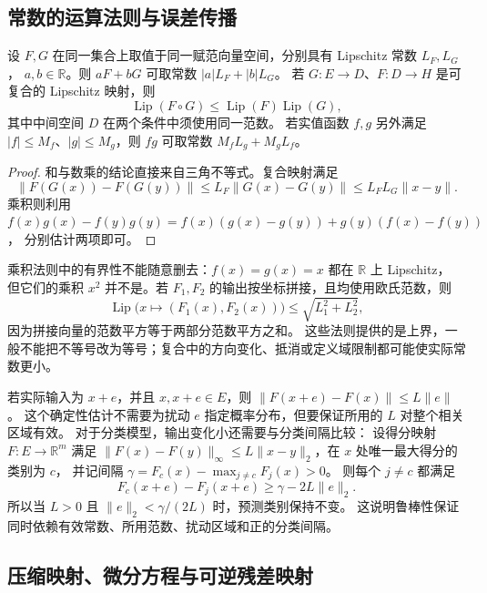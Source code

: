 \documentclass[UTF8,12pt,a4paper,fontset=fandol]{ctexart}
\begin{document}
\subsection{常数的运算法则与误差传播}
\label{subsec:lip-calculus}

\begin{proposition}\label{prop:lip-calculus}
设 $F,G$ 在同一集合上取值于同一赋范向量空间，分别具有 Lipschitz 常数 $L_F,L_G$，
$a,b\in\mathbb R$。则 $aF+bG$ 可取常数 $|a|L_F+|b|L_G$。
若 $G:E\to D$、$F:D\to H$ 是可复合的 Lipschitz 映射，则
\begin{equation}\label{eq:lip-composition}
  \operatorname{Lip}(F\circ G)\le\operatorname{Lip}(F)\operatorname{Lip}(G),
\end{equation}
其中中间空间 $D$ 在两个条件中须使用同一范数。
若实值函数 $f,g$ 另外满足 $|f|\le M_f$、$|g|\le M_g$，则 $fg$ 可取常数
$M_fL_g+M_gL_f$。
\end{proposition}
\begin{proof}
和与数乘的结论直接来自三角不等式。复合映射满足
\[
  \|F(G(x))-F(G(y))\|
  \le L_F\|G(x)-G(y)\|\le L_FL_G\|x-y\|.
\]
乘积则利用
$f(x)g(x)-f(y)g(y)=f(x)(g(x)-g(y))+g(y)(f(x)-f(y))$，
分别估计两项即可。
\end{proof}

乘积法则中的有界性不能随意删去：$f(x)=g(x)=x$ 都在 $\mathbb R$ 上 Lipschitz，
但它们的乘积 $x^2$ 并不是。若 $F_1,F_2$ 的输出按坐标拼接，且均使用欧氏范数，则
\[
  \operatorname{Lip}\bigl(x\mapsto(F_1(x),F_2(x))\bigr)
  \le\sqrt{L_1^2+L_2^2},
\]
因为拼接向量的范数平方等于两部分范数平方之和。
这些法则提供的是上界，一般不能把不等号改为等号；复合中的方向变化、抵消或定义域限制都可能使实际常数更小。

若实际输入为 $x+e$，并且 $x,x+e\in E$，则
$\|F(x+e)-F(x)\|\le L\|e\|$。
这个确定性估计不需要为扰动 $e$ 指定概率分布，但要保证所用的 $L$ 对整个相关区域有效。
对于分类模型，输出变化小还需要与分类间隔比较：
设得分映射 $F:E\to\mathbb R^m$ 满足
$\|F(x)-F(y)\|_\infty\le L\|x-y\|_2$，在 $x$ 处唯一最大得分的类别为 $c$，
并记间隔 $\gamma=F_c(x)-\max_{j\ne c}F_j(x)>0$。
则每个 $j\ne c$ 都满足
\[
  F_c(x+e)-F_j(x+e)\ge\gamma-2L\|e\|_2.
\]
所以当 $L>0$ 且 $\|e\|_2<\gamma/(2L)$ 时，预测类别保持不变。
这说明鲁棒性保证同时依赖有效常数、所用范数、扰动区域和正的分类间隔。

\subsection{压缩映射、微分方程与可逆残差映射}
\label{subsec:lip-fixed-point}
\end{document}
